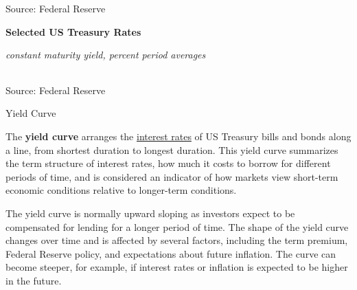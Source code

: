 \documentclass{report}
\newcommand{\tbllink}[1]{\href{https://raw.githubusercontent.com/bdecon/US-chartbook/master/chartbook/data/#1}{\faTable}}
\begin{document}
{\begin{minipage}{0.98\textwidth}
\footnotesize{Source: Federal Reserve} \hfill \tbllink{rates.csv}
\vspace{3mm}

\normalsize \textbf{Selected US Treasury Rates}\\
\footnotesize{\textit{constant maturity yield, percent \hspace{18mm}period averages}\\
\hspace*{-3mm}  \setlength{\tabcolsep}{2.0pt} \color{black!90}
		{\renewcommand{\arraystretch}{1.55}
\begin{tabular}{p{17mm} R{10.2mm} R{10.2mm} R{10.2mm} R{9.5mm}
		 		 R{9.5mm} R{9.5mm} R{9.5mm} R{9.5mm} R{9.5mm}}
			  \hline
		\end{tabular}}}

\vspace{-2mm}		
\footnotesize{Source: Federal Reserve}
\end{minipage}
\newpage
\vspace*{-11mm}

\begin{minipage}{0.76\textwidth}  
\normalsize Yield Curve
\vspace*{-1mm}

\small The \textbf{yield curve} arranges the \href{https://www.treasury.gov/resource-center/data-chart-center/interest-rates/Pages/TextView.aspx?data=yield}{interest rates} of US Treasury bills and bonds along a line, from shortest duration to longest duration. This yield curve summarizes the term structure of interest rates, how much it costs to borrow for different periods of time, and is considered an indicator of how markets view short-term economic conditions relative to longer-term conditions. 

The yield curve is normally upward sloping as investors expect to be compensated for lending for a longer period of time. The shape of the yield curve changes over time and is affected by several factors, including the term premium, Federal Reserve policy, and expectations about future inflation. The curve can become steeper, for example, if interest rates or inflation is expected to be higher in the future. 
\end{minipage}

\begin{minipage}{0.425\textwidth} 
\vspace{-2.5mm}


\end{minipage}}
\end{document}

